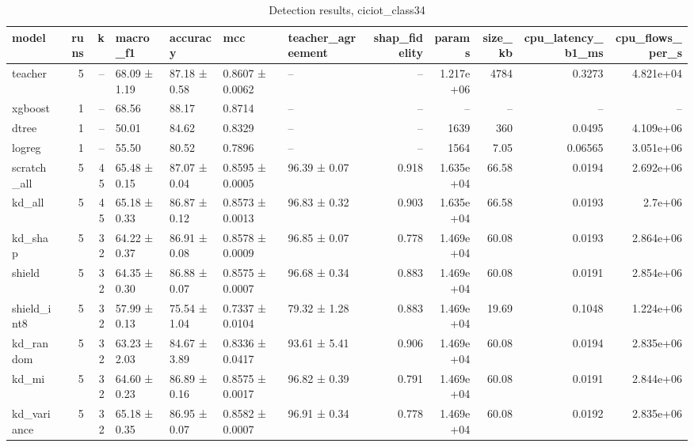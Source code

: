 \begin{table}
\caption{Detection results, ciciot_class34}
\begin{tabular}{lrrllllrrrrr}
\toprule
model & runs & k & macro_f1 & accuracy & mcc & teacher_agreement & shap_fidelity & params & size_kb & cpu_latency_b1_ms & cpu_flows_per_s \\
\midrule
teacher & 5 & -- & 68.09 ± 1.19 & 87.18 ± 0.58 & 0.8607 ± 0.0062 & -- & -- & 1.217e+06 & 4784 & 0.3273 & 4.821e+04 \\
xgboost & 1 & -- & 68.56 & 88.17 & 0.8714 & -- & -- & -- & -- & -- & -- \\
dtree & 1 & -- & 50.01 & 84.62 & 0.8329 & -- & -- & 1639 & 360 & 0.0495 & 4.109e+06 \\
logreg & 1 & -- & 55.50 & 80.52 & 0.7896 & -- & -- & 1564 & 7.05 & 0.06565 & 3.051e+06 \\
scratch_all & 5 & 45 & 65.48 ± 0.15 & 87.07 ± 0.04 & 0.8595 ± 0.0005 & 96.39 ± 0.07 & 0.918 & 1.635e+04 & 66.58 & 0.0194 & 2.692e+06 \\
kd_all & 5 & 45 & 65.18 ± 0.33 & 86.87 ± 0.12 & 0.8573 ± 0.0013 & 96.83 ± 0.32 & 0.903 & 1.635e+04 & 66.58 & 0.0193 & 2.7e+06 \\
kd_shap & 5 & 32 & 64.22 ± 0.37 & 86.91 ± 0.08 & 0.8578 ± 0.0009 & 96.85 ± 0.07 & 0.778 & 1.469e+04 & 60.08 & 0.0193 & 2.864e+06 \\
shield & 5 & 32 & 64.35 ± 0.30 & 86.88 ± 0.07 & 0.8575 ± 0.0007 & 96.68 ± 0.34 & 0.883 & 1.469e+04 & 60.08 & 0.0191 & 2.854e+06 \\
shield_int8 & 5 & 32 & 57.99 ± 0.13 & 75.54 ± 1.04 & 0.7337 ± 0.0104 & 79.32 ± 1.28 & 0.883 & 1.469e+04 & 19.69 & 0.1048 & 1.224e+06 \\
kd_random & 5 & 32 & 63.23 ± 2.03 & 84.67 ± 3.89 & 0.8336 ± 0.0417 & 93.61 ± 5.41 & 0.906 & 1.469e+04 & 60.08 & 0.0194 & 2.835e+06 \\
kd_mi & 5 & 32 & 64.60 ± 0.23 & 86.89 ± 0.16 & 0.8575 ± 0.0017 & 96.82 ± 0.39 & 0.791 & 1.469e+04 & 60.08 & 0.0191 & 2.844e+06 \\
kd_variance & 5 & 32 & 65.18 ± 0.35 & 86.95 ± 0.07 & 0.8582 ± 0.0007 & 96.91 ± 0.34 & 0.778 & 1.469e+04 & 60.08 & 0.0192 & 2.835e+06 \\
\bottomrule
\end{tabular}
\end{table}
